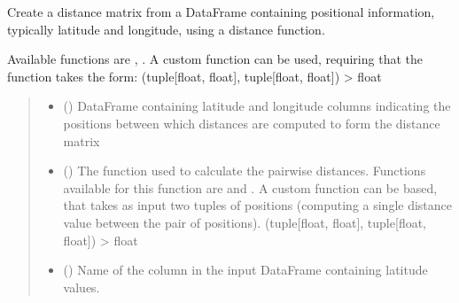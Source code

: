 \documentclass[letterpaper,10pt,english]{sphinxmanual}
\begin{document}
\begin{fulllineitems}
\label{\detokenize{misc:glomar_gridding.distances.calculate_distance_matrix}}
\pysigstartsignatures
\pysiglinewithargsret
{}
{\sphinxparamcomma {}\sphinxparamcomma {}\sphinxparamcomma {}\sphinxparamcomma {}}
{}
\pysigstopsignatures
\sphinxAtStartPar
Create a distance matrix from a DataFrame containing positional information,
typically latitude and longitude, using a distance function.

\sphinxAtStartPar
Available functions are , . A
custom function can be used, requiring that the function takes the form:
(tuple{[}float, float{]}, tuple{[}float, float{]}) \sphinxhyphen{}\textgreater{} float
\begin{quote}\begin{description}
\begin{itemize}
\item {}
\sphinxAtStartPar
{} () \textendash{} DataFrame containing latitude and longitude columns indicating the
positions between which distances are computed to form the distance
matrix

\item {}
\sphinxAtStartPar
{} () \textendash{} The function used to calculate the pairwise distances. Functions
available for this function are  and
.
A custom function can be based, that takes as input two tuples of
positions (computing a single distance value between the pair of
positions). (tuple{[}float, float{]}, tuple{[}float, float{]}) \sphinxhyphen{}\textgreater{} float

\item {}
\sphinxAtStartPar
{} () \textendash{} Name of the column in the input DataFrame containing latitude values.


\end{itemize}
\end{description}
\end{quote}
\end{fulllineitems}
\end{document}
